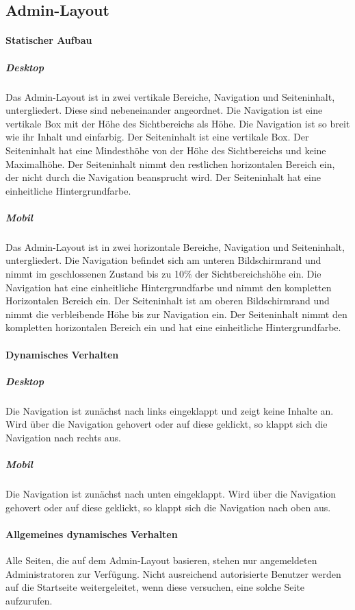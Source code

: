 \subsection{Admin-Layout}\label{AP_Admin-Layout}

\paragraph*{Statischer Aufbau}
\subparagraph*{Desktop}
Das Admin-Layout ist in zwei vertikale Bereiche, Navigation und Seiteninhalt, untergliedert. Diese sind nebeneinander angeordnet.
Die Navigation ist eine vertikale Box mit der Höhe des Sichtbereichs als Höhe.
Die Navigation ist so breit wie ihr Inhalt und einfarbig.
Der Seiteninhalt ist eine vertikale Box. Der Seiteninhalt hat eine Mindesthöhe von der Höhe des Sichtbereichs und keine Maximalhöhe.
Der Seiteninhalt nimmt den restlichen horizontalen Bereich ein, der nicht durch die Navigation beansprucht wird.
Der Seiteninhalt hat eine einheitliche Hintergrundfarbe.

\subparagraph*{Mobil}
Das Admin-Layout ist in zwei horizontale Bereiche, Navigation und Seiteninhalt, untergliedert.
Die Navigation befindet sich am unteren Bildschirmrand und nimmt im geschlossenen Zustand bis zu 10\% der Sichtbereichshöhe ein.
Die Navigation hat eine einheitliche Hintergrundfarbe und nimmt den kompletten Horizontalen Bereich ein.
Der Seiteninhalt ist am oberen Bildschirmrand und nimmt die verbleibende Höhe bis zur Navigation ein.
Der Seiteninhalt nimmt den kompletten horizontalen Bereich ein und hat eine einheitliche Hintergrundfarbe.

\paragraph*{Dynamisches Verhalten}
\subparagraph*{Desktop}
Die Navigation ist zunächst nach links eingeklappt und zeigt keine Inhalte an. Wird über die Navigation gehovert oder auf diese geklickt,
so klappt sich die Navigation nach rechts aus. 

\subparagraph*{Mobil}
Die Navigation ist zunächst nach unten eingeklappt. Wird über die Navigation gehovert oder auf diese geklickt,
so klappt sich die Navigation nach oben aus.

\paragraph*{Allgemeines dynamisches Verhalten}
Alle Seiten, die auf dem Admin-Layout basieren, stehen nur angemeldeten Administratoren zur Verfügung. 
Nicht ausreichend autorisierte Benutzer werden auf die Startseite weitergeleitet, wenn diese versuchen, eine solche Seite aufzurufen.

